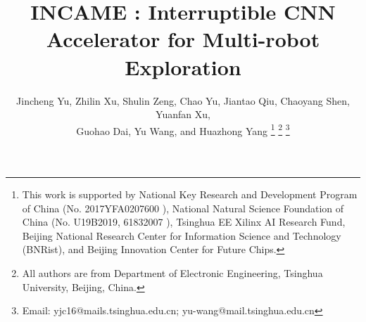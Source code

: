 \documentclass[journal]{IEEEtran}
\begin{document}
%
\title{INCAME : Interruptible CNN Accelerator for Multi-robot Exploration}
%
%
%



\author{Jincheng Yu,
        Zhilin Xu,
        Shulin Zeng,
        Chao Yu,
        Jiantao Qiu,
        Chaoyang Shen,
        Yuanfan Xu, \\
        Guohao Dai,
        Yu Wang,
        and Huazhong Yang %
\thanks{This work is supported by National Key Research and Development Program of China (No. 2017YFA0207600 ), National Natural Science Foundation of China (No. U19B2019, 61832007 ), Tsinghua EE Xilinx AI Research Fund, Beijing National Research Center for Information Science and Technology (BNRist), and Beijing Innovation Center for Future Chips.
}%
\thanks{All authors are from Department of Electronic Engineering, Tsinghua University, Beijing, China.}%
\thanks{Email: yjc16@mails.tsinghua.edu.cn; yu-wang@mail.tsinghua.edu.cn} }
\end{document}

